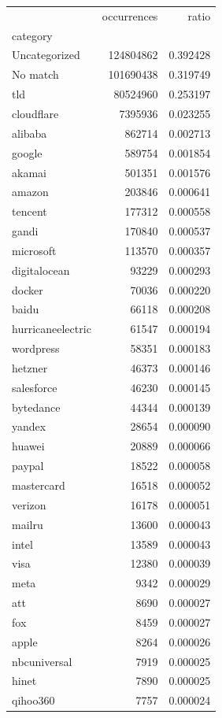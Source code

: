\begin{tabular}{lrr}
\toprule
 & occurrences & ratio \\
category &  &  \\
\midrule
Uncategorized & 124804862 & 0.392428 \\
No match & 101690438 & 0.319749 \\
tld & 80524960 & 0.253197 \\
cloudflare & 7395936 & 0.023255 \\
alibaba & 862714 & 0.002713 \\
google & 589754 & 0.001854 \\
akamai & 501351 & 0.001576 \\
amazon & 203846 & 0.000641 \\
tencent & 177312 & 0.000558 \\
gandi & 170840 & 0.000537 \\
microsoft & 113570 & 0.000357 \\
digitalocean & 93229 & 0.000293 \\
docker & 70036 & 0.000220 \\
baidu & 66118 & 0.000208 \\
hurricaneelectric & 61547 & 0.000194 \\
wordpress & 58351 & 0.000183 \\
hetzner & 46373 & 0.000146 \\
salesforce & 46230 & 0.000145 \\
bytedance & 44344 & 0.000139 \\
yandex & 28654 & 0.000090 \\
huawei & 20889 & 0.000066 \\
paypal & 18522 & 0.000058 \\
mastercard & 16518 & 0.000052 \\
verizon & 16178 & 0.000051 \\
mailru & 13600 & 0.000043 \\
intel & 13589 & 0.000043 \\
visa & 12380 & 0.000039 \\
meta & 9342 & 0.000029 \\
att & 8690 & 0.000027 \\
fox & 8459 & 0.000027 \\
apple & 8264 & 0.000026 \\
nbcuniversal & 7919 & 0.000025 \\
hinet & 7890 & 0.000025 \\
qihoo360 & 7757 & 0.000024 \\

\end{tabular}
